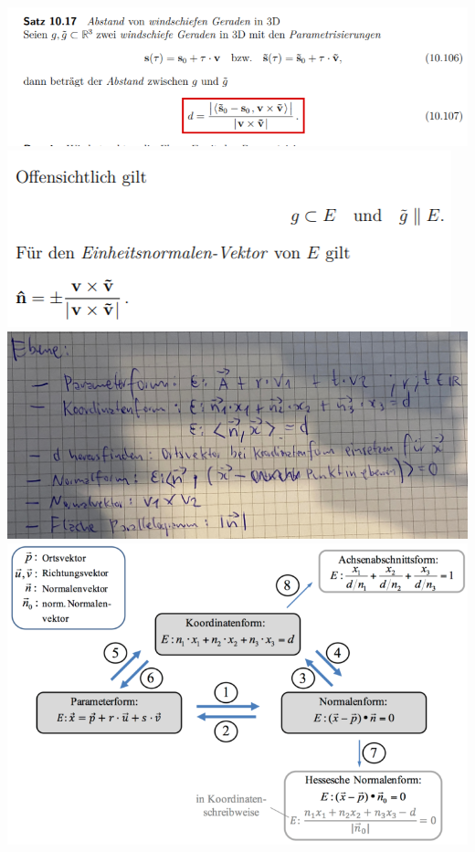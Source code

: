\includegraphics[width=\columnwidth]{./images/vek34.png}
\includegraphics[width=\columnwidth]{./images/vek35.png}
\includegraphics[width=\columnwidth]{./images/vek36.jpg}
\includegraphics[width=\columnwidth]{./images/awesome.png}
\vspace{1mm}